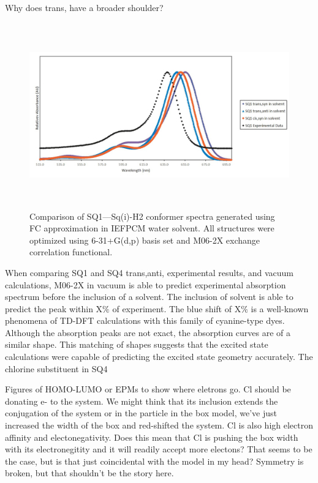 \documentclass[journal=jacsat,manuscript=article]{achemso}
\begin{document}
Why does trans, have a broader shoulder?


\begin{figure}[h]
    \centering
    \includegraphics[width=16cm,height=8cm]{figures/sq1_conformer_exp.jpg}
    \caption{Comparison of SQ1—Sq(i)-H2 conformer spectra generated using FC approximation in IEFPCM water solvent. All structures were optimized  using 6-31+G(d,p) basis set and M06-2X exchange correlation functional.}
    \label{fig:SQ1 conformers}
\end{figure}

When comparing SQ1 and SQ4 trans,anti, experimental results, and vacuum calculations, M06-2X in vacuum is able to predict experimental absorption spectrum before the inclusion of a solvent. The inclusion of solvent is able to predict the peak within X$\%$ of experiment. The blue shift of X$\%$ is a well-known phenomena of TD-DFT calculations with this family of cyanine-type dyes. Although the absorption peaks are not exact, the absorption curves are of a similar shape. This matching of shapes suggests that the excited state calculations were capable of predicting the excited state geometry accurately. The chlorine substituent in SQ4 

Figures of HOMO-LUMO or EPMs to show where eletrons go. Cl should be donating e- to the system. We might think that its inclusion extends the conjugation of the system or in the particle in the box model, we've just increased the width of the box and red-shifted the system. Cl is also high electron affinity and electonegativity. Does this mean that Cl is pushing the box width with its electronegitity and it will readily accept more electons?  That seems to be the case, but is that just coincidental with the model in my head? Symmetry is broken, but that shouldn't be the story here. 
\end{document}
